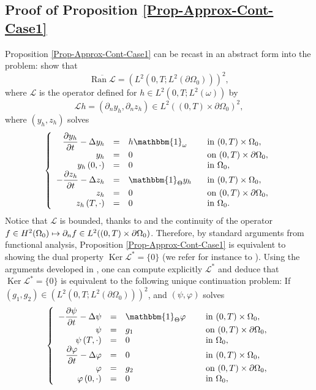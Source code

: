\documentclass[10pt,a4paper]{amsart}
\newcommand\mto{\mathchoice{\longmapsto}{\mapsto}{\mapsto}{\mapsto}}
\DeclareMathOperator{\Ker}{Ker}
\DeclareMathOperator{\Ran}{Ran}
\theoremstyle{definition}
\begin{document}
\subsection{Proof of Proposition \ref{Prop-Approx-Cont-Case1}}\label{Subsec-Proof-ApproxCont-Case1}
Proposition \ref{Prop-Approx-Cont-Case1} can be recast in an abstract form into the problem: show that
\[
\overline{ \Ran \mathcal{L} } = (L^2(0,T; L^2(\partial\Omega_0)))^2,
\]
where $\mathcal{L}$ is the operator defined for $h \in L^2(0,T; L^2(\omega))$ by
\[
\mathcal{L} h = (\partial_n y_h, \partial_n z_h)\in L^2((0,T)\times\partial\Omega_0)^2,
\]
where $(y_h,z_h)$ solves
\begin{equation}\label{csanss}
\left\{
\begin{array}{rcll}
\dfrac{\partial y_h}{\partial t}-\Delta y_h &=&h\mathbbm{1}_{\omega}\quad&\text{ in }(0,T) \times \Omega_0,
\\
y_h &=& 0 &\text{ on }(0,T) \times \partial \Omega_0,
\\
y_h\left(0,\cdot\right) &=& 0 &\text{ in }\Omega_0,
\\
-\dfrac{\partial z_h}{\partial t}-\Delta z_h &=&\mathbbm{1}_{\Theta}y_h &\text{ in }(0,T) \times \Omega_0,
\\
z_h &=& 0 &\text{ on }(0,T) \times \partial \Omega_0,
\\
z_h\left(T,\cdot\right) &=& 0 &\text{ in }\Omega_0.
\end{array}
\right.
\end{equation}
Notice that $\mathcal L$ is bounded, thanks to \cite[Th.\,5, p.\,382]{Evans} and the continuity of the operator $f\in H^2(\Omega_0) \mto \partial_n f\in L^2((0,T)\times\partial\Omega_0)$.
Therefore, by standard arguments from functional analysis, Proposition \ref{Prop-Approx-Cont-Case1} is equivalent to showing the dual property $\Ker\mathcal{L}^* = \{0\}$ (we refer for instance to \cite[Cor.\,2.18]{Brezis}). Using the arguments developed in \cite[Prop.\,2.1]{Lissy-Privat-Simpore}, one can compute explicitly $\mathcal L^*$ and deduce that $\Ker\mathcal{L}^* = \{0\}$ is equivalent to the following unique continuation problem: If $(g_1, g_2) \in (L^2(0,T; L^2(\partial\Omega_0)))^2$, and $(\psi, \varphi)$ solves
\begin{equation}
\label{Coupled-Heat-Approx-Adj}
\left\{
\begin{array}{rcll}
-\dfrac{\partial \psi}{\partial t}-\Delta \psi &=&\mathbbm{1}_{\Theta}\varphi \quad&\text{ in }(0,T) \times \Omega_0,
\\
\psi &=& g_1 &\text{ on }(0,T) \times \partial \Omega_0,
\\
\psi \left(T,\cdot\right) &=& 0 &\text{ in }\Omega_0,
\\
\dfrac{\partial \varphi}{\partial t}-\Delta \varphi &=& 0 &\text{ in }(0,T) \times \Omega_0,
\\
\varphi &=& g_2 &\text{ on }(0,T) \times \partial \Omega_0,
\\
\varphi\left(0,\cdot\right) &=& 0 &\text{ in }\Omega_0,
\end{array}
\right.
\end{equation}
\end{document}
